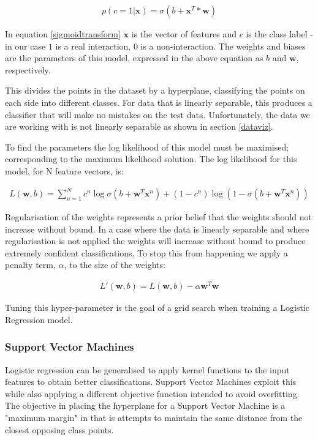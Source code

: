 \begin{align}
    p(c=1|\pmb{x}) = \sigma(b + \pmb{x}^{T}*\pmb{w})
    \label{sigmoidtransform}
\end{align}

In equation \ref{sigmoidtransform} $\pmb{x}$ is the vector of features and $c$ is the class label - in our case $1$ is a real interaction, $0$ is a non-interaction.
The weights and biases are the parameters of this model, expressed in the above equation as $b$ and $\pmb{w}$, respectively.

This divides the points in the dataset by a hyperplane, classifying the points on each side into different classes.
For data that is linearly separable, this produces a classifier that will make no mistakes on the test data.
Unfortunately, the data we are working with is not linearly separable as shown in section \ref{dataviz}.

To find the parameters the log likelihood of this model must be maximised; corresponding to the maximum likelihood solution.
The log likelihood for this model, for N feature vectors, is:

\begin{align}
    L(\pmb{w},b) = \sum_{n=1}^{N} c^{n} \log \sigma(b + \pmb{w}^{T}\pmb{x}^{n}) + (1 - c^{n})\log (1 - \sigma(b + \pmb{w}^{T}\pmb{x}^{n}))
\end{align}

Regularisation of the weights represents a prior belief that the weights should not increase without bound.
In a case where the data is linearly separable and where regularisation is not applied the weights will increase without bound to produce extremely confident classifications\autocite[381]{barber_bayesian_2013}.
To stop this from happening we apply a penalty term, $\alpha$, to the size of the weights:

\begin{align}
    L'(\pmb{w},b) = L(\pmb{w},b) - \alpha \pmb{w}^{T}\pmb{w}
\end{align}

Tuning this hyper-parameter is the goal of a grid search when training a Logistic Regression model.

\subsubsection*{Support Vector Machines}

Logistic regression can be generalised to apply kernel functions to the input features to obtain better classifications.
Support Vector Machines exploit this while also applying a different objective function intended to avoid overfitting\autocite[383]{murphy_machine_2012}.
The objective in placing the hyperplane for a Support Vector Machine is a "maximum margin" in that is attempts to maintain the same distance from the closest opposing class points.

